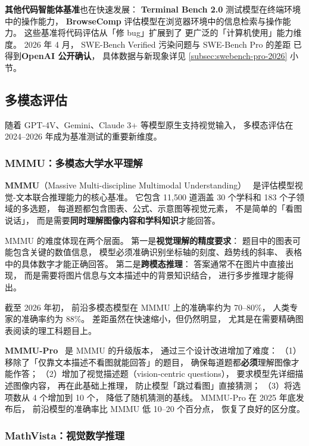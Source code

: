 \textbf{其他代码智能体基准}也在快速发展：
\textbf{Terminal Bench 2.0} 测试模型在终端环境中的操作能力，
\textbf{BrowseComp} 评估模型在浏览器环境中的信息检索与操作能力。
这些基准将代码评估从「修 bug」扩展到了
更广泛的「计算机使用」能力维度。
2026 年 4 月，
SWE-Bench Verified 污染问题与 SWE-Bench Pro 的差距
已得到\textbf{OpenAI 公开确认}，
具体数据与新现象详见
\ref{subsec:swebench-pro-2026} 小节。

\subsection{多模态评估}
\label{subsec:multimodal-eval}

随着 GPT-4V、Gemini、Claude 3+ 等模型原生支持视觉输入，
多模态评估在 2024--2026 年成为基准测试的重要新维度。

\subsubsection{MMMU：多模态大学水平理解}

\textbf{MMMU}（Massive Multi-discipline Multimodal Understanding）~\cite{yue2024mmmu}
是评估模型视觉-文本联合推理能力的核心基准。
它包含 11,500 道涵盖 30 个学科和 183 个子领域的多选题，
每道题都包含图表、公式、示意图等视觉元素，
不是简单的「看图说话」，
而是需要\textbf{同时理解图像内容和学科知识}才能回答。

MMMU 的难度体现在两个层面。
第一是\textbf{视觉理解的精度要求}：
题目中的图表可能包含关键的数值信息，
模型必须准确识别坐标轴的刻度、趋势线的斜率、
表格中的具体数字才能正确回答。
第二是\textbf{跨模态推理}：
答案通常不在图片中直接出现，
而是需要将图片信息与文本描述中的背景知识结合，
进行多步推理才能得出。

截至 2026 年初，
前沿多模态模型在 MMMU 上的准确率约为 70--80\%，
人类专家的准确率约为 88\%。
差距虽然在快速缩小，但仍然明显，
尤其是在需要精确图表阅读的理工科题目上。

\textbf{MMMU-Pro}~\cite{yue2024mmmupro}
是 MMMU 的升级版本，
通过三个设计改进增加了难度：
（1）移除了「仅靠文本描述不看图就能回答」的题目，
确保每道题都\textbf{必须}理解图像才能作答；
（2）增加了视觉描述题（vision-centric questions），
要求模型先详细描述图像内容，
再在此基础上推理，
防止模型「跳过看图」直接猜测；
（3）将选项数从 4 个增加到 10 个，
降低了随机猜测的基线。
MMMU-Pro 在 2025 年底发布后，
前沿模型的准确率比 MMMU 低 10--20 个百分点，
恢复了良好的区分度。

\subsubsection{MathVista：视觉数学推理}


